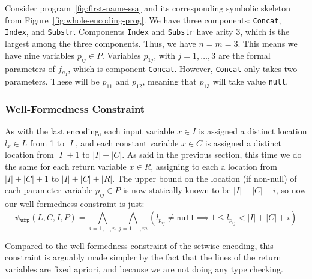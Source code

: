 \begin{example}
  Consider program~\ref{fig:first-name-ssa} and its corresponding symbolic
  skeleton from Figure~\ref{fig:whole-encoding-prog}.
  We have three components: \lstinline{Concat}, \lstinline{Index}, and
  \lstinline{Substr}.
  Components \lstinline{Index} and \lstinline{Substr} have arity 3,
  which is the largest among the three components.
  Thus, we have $n = m = 3$. This means we have nine variables $p_{ij} \in P$.
  Variables $p_{1j}$, with $j = 1, \ldots, 3$ are the formal parameters of
  $f_{a_1}$, which is component \lstinline{Concat}.
  However, \lstinline{Concat} only takes two parameters.
  These will be $p_{11}$ and $p_{12}$, meaning that $p_{13}$ will take value
  \lstinline{null}.
\end{example}

\subsubsection{Well-Formedness Constraint}
\label{sec:whole-well-formedness-constraint}

As with the last encoding, each input variable $x \in I$ is assigned a distinct
location $l_x \in L$ from 1 to $|I|$, and each constant variable $x \in C$ is assigned
a distinct location from $|I| + 1$ to $|I| + |C|$.
As said in the previous section, this time we do the same for each return
variable $x \in R$, assigning to each a location from $|I| + |C| + 1$ to
$|I| + |C| + |R|$.
The upper bound on the location (if non-null) of each parameter variable $p_{ij}
\in P$ is now statically known to be $|I| + |C| + i$, so now our well-formedness
constraint is just:
%
\[
  \psi{}_{\mathtt{wfp}}(L,C,I,P) =
  \bigwedge_{i = 1, \ldots, n}\bigwedge_{j = 1, \ldots, m}
  (l_{p_{ij}} \neq \mathtt{null} \implies 1 \leq l_{p_{ij}} < |I| + |C| + i)
\]

\noindent
Compared to the well-formedness constraint of the setwise encoding, this
constraint is arguably made simpler by the fact that the lines of the return
variables are fixed apriori, and because we are not doing any type checking.


